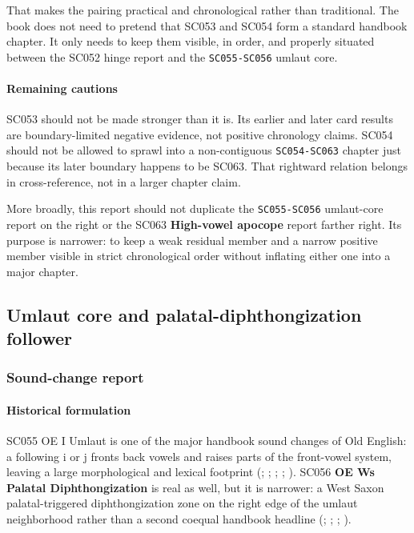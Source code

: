 \documentclass[
  british,
  a4paper,
]{article}
\begin{document}
That makes the pairing practical and chronological rather than
traditional. The book does not need to pretend that SC053 and SC054 form
a standard handbook chapter. It only needs to keep them visible, in
order, and properly situated between the SC052 hinge report and the
\texttt{SC055-SC056} umlaut core.

\paragraph{Remaining cautions}\label{remaining-cautions-33}

SC053 should not be made stronger than it is. Its earlier and later card
results are boundary-limited negative evidence, not positive chronology
claims. SC054 should not be allowed to sprawl into a non-contiguous
\texttt{SC054-SC063} chapter just because its later boundary happens to
be SC063. That rightward relation belongs in cross-reference, not in a
larger chapter claim.

More broadly, this report should not duplicate the \texttt{SC055-SC056}
umlaut-core report on the right or the SC063 \textbf{High-vowel apocope}
report farther right. Its purpose is narrower: to keep a weak residual
member and a narrow positive member visible in strict chronological
order without inflating either one into a major chapter.

\subsection{Umlaut core and palatal-diphthongization
follower}\label{umlaut-core-and-palatal-diphthongization-follower}

\subsubsection{Sound-change report}\label{sound-change-report-34}

\paragraph{Historical formulation}\label{historical-formulation-34}

SC055 OE I Umlaut is one of the major handbook sound changes of Old
English: a following i or j fronts back vowels and raises parts of the
front-vowel system, leaving a large morphological and lexical footprint
(;
;
;
; ). SC056
\textbf{OE Ws Palatal Diphthongization} is real as well, but it is
narrower: a West Saxon palatal-triggered diphthongization zone on the
right edge of the umlaut neighborhood rather than a second coequal
handbook headline (;
;
;
).
\end{document}
